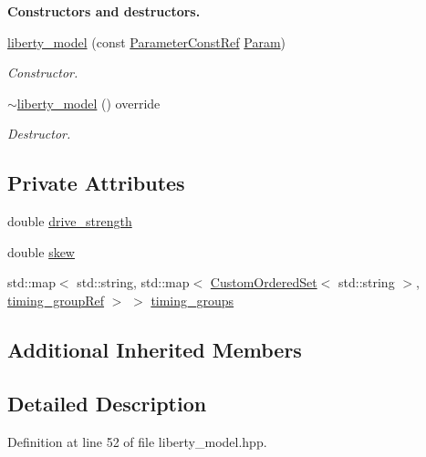 \begin{Indent}\textbf{ Constructors and destructors.}\par
\begin{DoxyCompactItemize}
\item 
\hyperlink{classliberty__model_a581807fbf6a780b5cf8a4e7cb3afb1c4}{liberty\+\_\+model} (const \hyperlink{Parameter_8hpp_a37841774a6fcb479b597fdf8955eb4ea}{Parameter\+Const\+Ref} \hyperlink{classtime__model_adfd18786156118b7467cef8117933674}{Param})
\begin{DoxyCompactList}\small\item\em Constructor. \end{DoxyCompactList}\item 
\hyperlink{classliberty__model_adbd9cd5623f351c59d62e07e36a9254f}{$\sim$liberty\+\_\+model} () override
\begin{DoxyCompactList}\small\item\em Destructor. \end{DoxyCompactList}\end{DoxyCompactItemize}
\end{Indent}
\subsection*{Private Attributes}
\begin{DoxyCompactItemize}
\item 
double \hyperlink{classliberty__model_ae47f16afa45beaf42e9bc1e377789d2b}{drive\+\_\+strength}
\item 
double \hyperlink{classliberty__model_a5ba9d49f59843f2522156c16fc5a991e}{skew}
\item 
std\+::map$<$ std\+::string, std\+::map$<$ \hyperlink{classCustomOrderedSet}{Custom\+Ordered\+Set}$<$ std\+::string $>$, \hyperlink{timing__group_8hpp_a343803fe4e1a65fd6b57b504c2ed67ca}{timing\+\_\+group\+Ref} $>$ $>$ \hyperlink{classliberty__model_a35b42c0531685ae05069c6fd083231e9}{timing\+\_\+groups}
\end{DoxyCompactItemize}
\subsection*{Additional Inherited Members}


\subsection{Detailed Description}


Definition at line 52 of file liberty\+\_\+model.\+hpp.



